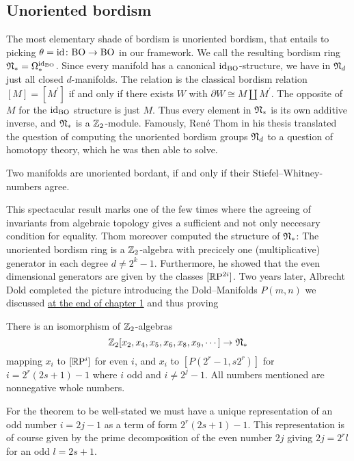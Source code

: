 \subsection{Unoriented bordism}
The most elementary shade of bordism is unoriented bordism, that entails to picking $\theta=\operatorname{id}\colon \mathrm{BO} \to \mathrm{BO}$ in our framework.
We call the resulting bordism ring $\mathfrak{N}_\ast = \Omega_\ast^{\operatorname{id}_{\mathrm{BO}}}$.
Since every manifold has a canonical $\operatorname{id}_{\mathrm{BO}}$-structure, we have in $\mathfrak{N}_d$ just all closed $d$-manifolds.
The relation is the classical bordism relation $[M] = [M^\prime]$ if and only if there exists $W$ with $\partial W \cong M \amalg M^\prime $.
The opposite of $M$ for the $\operatorname{id}_{\mathrm{BO}}$ structure is just $M$.
Thus every element in $\mathfrak{N}_\ast$ is its own additive inverse, and $\mathfrak{N}_\ast$ is a $\mathbb{Z}_2$-module. 
Famously, Ren\'e Thom in his thesis \cite{thom:bord} translated the question of computing the unoriented bordism groups $\mathfrak{N}_d$ to a question of homotopy theory, which he was then able to solve.
\begin{theorem*}[Thom, 1954]
    Two manifolds are unoriented bordant, if and only if their Stiefel--Whitney-numbers agree.
\end{theorem*}
This spectacular result marks one of the few times where the agreeing of invariants from algebraic topology gives a sufficient and not only neccesary condition for equality.
Thom moreover computed the structure of $\mathfrak{N}_\ast$: 
The unoriented bordism ring is a $\mathbb{Z}_2$-algebra with precicely one (multiplicative) generator in each degree $d\neq 2^k - 1$.
Furthermore, he showed that the even dimensional generators are given by the classes $[\mathbb{R}\mathrm{P}^{2i}]$. 
Two years later, Albrecht Dold \cite{dold:bord} completed the picture introducing the Dold--Manifolds $P(m,n)$ we discussed \hyperlink{doldmnf}{at the end of chapter 1} and thus proving
\begin{theorem*}
    There is an isomorphism of $\mathbb{Z}_2$-algebras
    \begin{equation*}
        \mathbb{Z}_2[x_2,x_4,x_5,x_6,x_8,x_9,\cdots]\to\mathfrak{N}_\ast
    \end{equation*}
    mapping $x_{i}$ to $[\mathbb{R}\mathrm{P}^{i}]$ for even $i$, and $x_i$ to $[P(2^r-1,s2^r)]$ for $i = 2^r(2s + 1) - 1$ where $i$ odd and $i\neq 2^j - 1$. All numbers mentioned are nonnegative whole numbers.
\end{theorem*}
For the theorem to be well-stated we must have a unique representation of an odd number $i = 2j -1$ as a term of form $2^r(2s + 1) -1$.
This representation is of course given by the prime decomposition of the even number $2j$ giving $2j = 2^r l$ for an odd $l = 2s + 1$.
